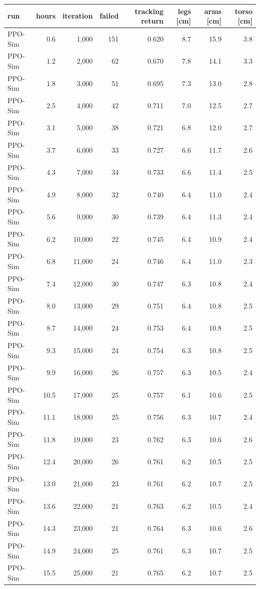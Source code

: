 \begin{tabular}{lrrrrrrr}\toprule
run & hours & iteration & failed & tracking return & legs [cm] & arms [cm] & torso [cm] \\\midrule
PPO-Sim & 0.6 & 1,000 & 151 & 0.620 & 8.7 & 15.9 & 3.8 \\
PPO-Sim & 1.2 & 2,000 & 62 & 0.670 & 7.8 & 14.1 & 3.3 \\
PPO-Sim & 1.8 & 3,000 & 51 & 0.695 & 7.3 & 13.0 & 2.8 \\
PPO-Sim & 2.5 & 4,000 & 42 & 0.711 & 7.0 & 12.5 & 2.7 \\
PPO-Sim & 3.1 & 5,000 & 38 & 0.721 & 6.8 & 12.0 & 2.7 \\
PPO-Sim & 3.7 & 6,000 & 33 & 0.727 & 6.6 & 11.7 & 2.6 \\
PPO-Sim & 4.3 & 7,000 & 34 & 0.733 & 6.6 & 11.4 & 2.5 \\
PPO-Sim & 4.9 & 8,000 & 32 & 0.740 & 6.4 & 11.0 & 2.4 \\
PPO-Sim & 5.6 & 9,000 & 30 & 0.739 & 6.4 & 11.3 & 2.4 \\
PPO-Sim & 6.2 & 10,000 & 22 & 0.745 & 6.4 & 10.9 & 2.4 \\
PPO-Sim & 6.8 & 11,000 & 24 & 0.746 & 6.4 & 11.0 & 2.3 \\
PPO-Sim & 7.4 & 12,000 & 30 & 0.747 & 6.3 & 10.8 & 2.4 \\
PPO-Sim & 8.0 & 13,000 & 29 & 0.751 & 6.4 & 10.8 & 2.5 \\
PPO-Sim & 8.7 & 14,000 & 24 & 0.753 & 6.4 & 10.8 & 2.5 \\
PPO-Sim & 9.3 & 15,000 & 24 & 0.754 & 6.3 & 10.8 & 2.5 \\
PPO-Sim & 9.9 & 16,000 & 26 & 0.757 & 6.3 & 10.5 & 2.4 \\
PPO-Sim & 10.5 & 17,000 & 25 & 0.757 & 6.1 & 10.6 & 2.5 \\
PPO-Sim & 11.1 & 18,000 & 25 & 0.756 & 6.3 & 10.7 & 2.4 \\
PPO-Sim & 11.8 & 19,000 & 23 & 0.762 & 6.3 & 10.6 & 2.6 \\
PPO-Sim & 12.4 & 20,000 & 26 & 0.761 & 6.2 & 10.5 & 2.5 \\
PPO-Sim & 13.0 & 21,000 & 23 & 0.761 & 6.2 & 10.7 & 2.5 \\
PPO-Sim & 13.6 & 22,000 & 21 & 0.763 & 6.2 & 10.5 & 2.4 \\
PPO-Sim & 14.3 & 23,000 & 21 & 0.764 & 6.3 & 10.6 & 2.6 \\
PPO-Sim & 14.9 & 24,000 & 25 & 0.761 & 6.3 & 10.7 & 2.5 \\
PPO-Sim & 15.5 & 25,000 & 21 & 0.765 & 6.2 & 10.7 & 2.5 \\

\end{tabular}
